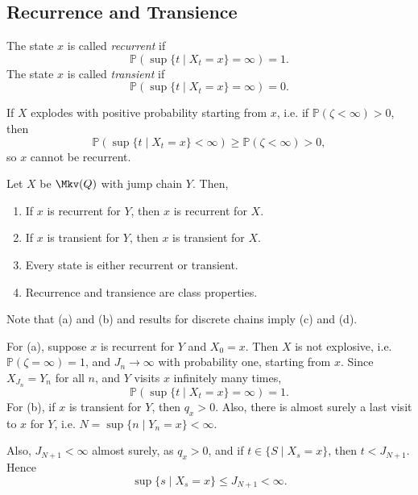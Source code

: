 \documentclass[12pt]{article}
\begin{document}
\subsection{Recurrence and Transience}
\label{sub:recurrence_and_transience}

\begin{definition}
	The state $x$ is called \emph{recurrent} if
	\[
		\mathbb{P}(\sup \{t \mid X_t = x\} = \infty) = 1
	.\]
	The state $x$ is called \emph{transient} if
	\[
		\mathbb{P}(\sup \{t \mid X_t = x\} = \infty) = 0
	.\]
\end{definition}

\begin{remark}
	If $X$ explodes with positive probability starting from $x$, i.e. if $\mathbb{P}(\zeta < \infty) > 0$, then
	\[
		\mathbb{P}( \sup\{t \mid X_t = x\} < \infty) \geq \mathbb{P}(\zeta < \infty) > 0
	,\]
	so $x$ cannot be recurrent.
\end{remark}

\begin{theorem}
	Let $X$ be $\Mkv(Q)$ with jump chain $Y$. Then,
	\begin{enumerate}[\normalfont(a)]
		\item If $x$ is recurrent for $Y$, then $x$ is recurrent for $X$.
		\item If $x$ is transient for $Y$, then $x$ is transient for $X$.
		\item Every state is either recurrent or transient.
		\item Recurrence and transience are class properties.
	\end{enumerate}
\end{theorem}

\begin{proofbox}
	Note that (a) and (b) and results for discrete chains imply (c) and (d).

	For (a), suppose $x$ is recurrent for $Y$ and $X_0 = x$. Then $X$ is not explosive, i.e. $\mathbb{P}(\zeta = \infty) = 1$, and $J_n \to \infty$ with probability one, starting from $x$. Since $X_{J_n} = Y_n$ for all $n$, and $Y$ visits $x$ infinitely many times,
	\[
		\mathbb{P}(\sup \{t \mid X_t = x\} = \infty) = 1
	.\]
	For (b), if $x$ is transient for $Y$, then $q_x > 0$. Also, there is almost surely a last visit to $x$ for $Y$, i.e. $N = \sup\{n \mid Y_n = x\} < \infty$.

	Also, $J_{N+1} < \infty$ almost surely, as $q_x > 0$, and if $t \in \{S \mid X_s = x\}$, then $t < J_{N+1}$. Hence
	\[
		\sup\{s \mid X_s = x\} \leq J_{N+1} < \infty
	.\]
\end{proofbox}
\end{document}
